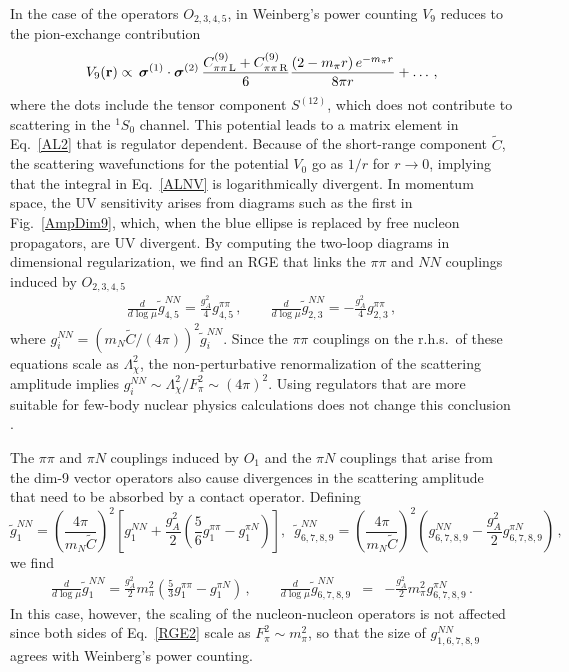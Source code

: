 \documentclass[letterpaper,11pt]{article}
\newcommand{\boldsigma}{\mbox{\boldmath $\sigma$}}
\renewcommand{\vec}[1]{{\mathbf #1}}
\begin{document}
In the case of the operators $O_{2,3,4,5}$, in Weinberg's power counting $V_9$ reduces to the pion-exchange contribution
\begin{equation}\label{ALNV}
V_9(\vec r) \propto \, \boldsigma^{(1)} \cdot \boldsigma^{(2)} \, \frac{C^{(9)}_{\pi \pi\,\rm L} + C^{(9)}_{\pi \pi\,\rm R} }{6}   \frac{\left(2 - m_\pi r\right) e^{- m_\pi r}}{8 \pi r}  + \ldots\,,
\end{equation}
where the dots include the tensor component $S^{(12)}$, which does not contribute to scattering in the $^1S_0$ channel.
This potential leads to a matrix element in Eq.\ \eqref{AL2} that is regulator dependent. 
Because of the short-range component $\tilde C$, the scattering wavefunctions for the potential $V_0$  
go as $1/r$ for $r \rightarrow 0$, implying that the integral in Eq.\ \eqref{ALNV} is logarithmically divergent. 
In momentum space, the UV sensitivity arises from diagrams such as the first in Fig.\ \ref{AmpDim9},
which, when the blue ellipse is replaced by free nucleon propagators, are UV divergent.
By computing the two-loop diagrams in dimensional regularization, we  find an RGE that links the $\pi\pi$ and $NN$ couplings induced by $O_{2,3,4,5}$
\begin{eqnarray}\label{npRGE}
\frac{d}{d \log \mu} \tilde{g}^{NN}_{4,5} =  \frac{g_A^2}{4} g^{\pi\pi}_{4,5}\,,  \qquad 
\frac{d}{d \log \mu} \tilde{g}^{NN}_{2,3} = - \frac{g_A^2}{4} g^{\pi\pi}_{2,3}\,,  
\end{eqnarray}
where $g^{NN}_i = (m_N \tilde C/(4\pi))^2 \tilde g^{NN}_i$. Since the $\pi\pi$ couplings on the r.h.s.\ of these equations scale as $\Lambda^2_\chi$, 
the non-perturbative renormalization of the scattering amplitude implies $g_{i}^{NN} \sim \Lambda^2_\chi/F_\pi^2 \sim (4\pi)^2$.
Using regulators that are more suitable for few-body nuclear physics calculations does not change this conclusion   \cite{Cirigliano:2018hja}.



The $\pi\pi$ and $\pi N$ couplings induced by $O_1$ and the $\pi N$ couplings that arise from the dim-9 vector operators 
also cause divergences in the scattering amplitude that need to be absorbed by a contact operator. 
Defining
\begin{equation}
\tilde g_{1}^{NN} =  \left(\frac{4\pi}{m_N \tilde C}\right)^2  \left[ g_{1}^{NN}  + \frac{g_A^2}{2} \left(\frac{5}{6} g^{\pi\pi}_{1} - g^{\pi N}_{1}\right)\right],\,\,\, \tilde{g}_{6,7,8,9}^{NN}  = \left( \frac{4\pi}{m_N \tilde C}\right)^2  \left( g_{6,7,8,9}^{NN}  - \frac{g_A^2}{2} g_{6,7,8,9}^{\pi N} \right)\,,
\end{equation}
we find 
\begin{eqnarray}\label{RGE2}
\frac{d}{d\log \mu} \tilde g_{1}^{NN} = \frac{g_A^2}{2} m_\pi^2 \left( \frac{5}{3} g^{\pi\pi}_{1} - g^{\pi N}_{1}\right)\,, \qquad 
\frac{d}{d\log \mu} \tilde g_{6,7,8,9}^{NN} &=& - \frac{g_A^2}{2} m_\pi^2 g_{6,7,8,9}^{\pi N}\,.
\end{eqnarray}
In this case, however, the scaling of the nucleon-nucleon operators is not affected since both sides of Eq.\ \eqref{RGE2} scale as $F_\pi^2 \sim m_\pi^2$, so that the size of $g_{1,6,7,8,9}^{NN}$ agrees with Weinberg's power counting. 
\end{document}
